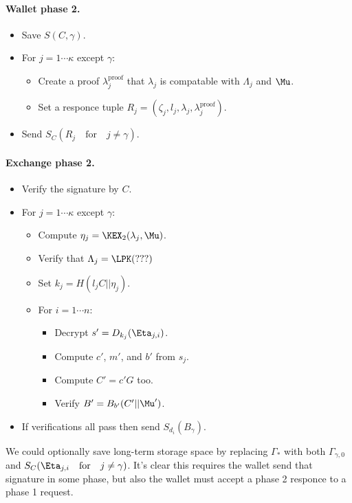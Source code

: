 \documentclass{llncs}
\begin{document}
\paragraph{Wallet phase 2.}
\begin{itemize}
\item  Save $S(C,\gamma)$.
\item  For $j = 1 \cdots \kappa$ except $\gamma$:
   \begin{itemize}
   \item  Create a proof $\lambda_j^{\textrm{proof}}$ that
          $\lambda_j$ is compatable with $\Lambda_j$ and $\Mu$.
   \item  Set a responce tuple
          $R_j = (\zeta_j,l_j,\lambda_j,\lambda_j^{\textrm{proof}})$.
   \end{itemize}
\item  Send $S_C(R_j \quad\textrm{for}\quad j \ne \gamma )$.
\end{itemize}

\paragraph{Exchange phase 2.}
\begin{itemize}
\item  Verify the signature by $C$.
\item  For $j = 1 \cdots \kappa$ except $\gamma$:
   \begin{itemize}
   \item  Compute $\eta_j = \KEX_2(\lambda_j,\Mu)$.
   \item  Verify that $\Lambda_j = \LPK(???)$
   \item  Set $k_j = H(l_j C || \eta_j)$.
   \item  For $i=1 \cdots n$:
     \begin{itemize}
     \item  Decrypt $s' = D_{k_j}(\Eta_{j,i})$.
     \item  Compute $c'$, $m'$, and $b'$ from $s_j$.
     \item  Compute $C' = c' G$ too.
     \item  Verify $B' = B_{b'}(C' || \Mu')$.
     \end{itemize}
   \end{itemize}
\item  If verifications all pass then send $S_{d_i}(B_\gamma)$.
\end{itemize}

We could optionally save long-term storage space by
replacing $\Gamma_*$ with both $\Gamma_{\gamma,0}$ and
 $S_C(\Eta_{j,i} \quad\textrm{for}\quad j \ne \gamma )$.
It's clear this requires the wallet send that signature in some phase,
but also the wallet must accept a phase 2 responce to a phase 1 request.
\end{document}
